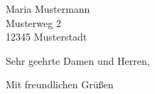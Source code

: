 \documentclass[DIN,parskip=half,fromrule=no,fontsize=11pt,fromalign=right,fromrule=afteraddress,ngerman,enlargefirstpage=true]{scrlttr2}
\date{\usekomavar{fromplace}, \getfourfromjobname.\getthreefromjobname.\gettwofromjobname}
\begin{document}
\begin{letter}{Maria Mustermann \\ Musterweg 2 \\ 12345 Musterstadt}
\opening{Sehr geehrte Damen und Herren,} 
 
\blindtext[5]
 
\closing{Mit freundlichen Grüßen}
 
\end{letter}
\end{document}
